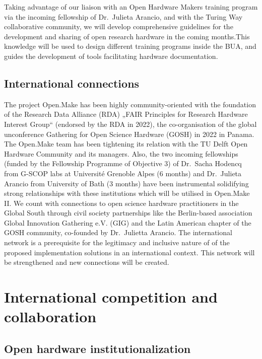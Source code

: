\documentclass[
  12pt,
  a4paper,
]{article}
\begin{document}
Taking advantage of our liaison with an Open Hardware Makers training
program via the incoming fellowship of Dr.~Julieta Arancio, and with the
Turing Way collaborative community, we will develop comprehensive
guidelines for the development and sharing of open research hardware in
the coming months.This knowledge will be used to design different
training programs inside the BUA, and guides the development of tools
facilitating hardware documentation.

\hypertarget{international-connections}{%
\subsection{International connections}\label{international-connections}}

The project Open.Make has been highly community-oriented with the
foundation of the Research Data Alliance (RDA) „FAIR Principles for
Research Hardware Interest Group`` (endorsed by the RDA in 2022), the
co-organisation of the global unconference Gathering for Open Science
Hardware (GOSH) in 2022 in Panama. The Open.Make team has been
tightening its relation with the TU Delft Open Hardware Community and
its managers. Also, the two incoming fellowships (funded by the
Fellowship Programme of Objective 3) of Dr.~Sacha Hodencq from G-SCOP
labs at Université Grenoble Alpes (6 months) and Dr.~Julieta Arancio
from University of Bath (3 months) have been instrumental solidifying
strong relationships with these institutions which will be utilised in
Open.Make II. We count with connections to open science hardware
practitioners in the Global South through civil society partnerships
like the Berlin-based association Global Innovation Gathering e.V. (GIG)
and the Latin American chapter of the GOSH community, co-founded by
Dr.~Julietta Arancio. The international network is a prerequisite for
the legitimacy and inclusive nature of of the proposed implementation
solutions in an international context. This network will be strengthened
and new connections will be created.

\hypertarget{international-competition-and-collaboration}{%
\section{International competition and
collaboration}\label{international-competition-and-collaboration}}

\hypertarget{open-hardware-institutionalization}{%
\subsection{Open hardware
institutionalization}\label{open-hardware-institutionalization}}
\end{document}
